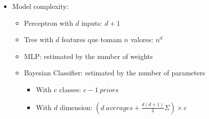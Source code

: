 \documentclass[twocolumn, 10pt]{article}
\begin{document}
\begin{itemize}[leftmargin=*, itemsep=0pt]
\begin{itemize}[topsep=0pt]
    \end{itemize}

    \item Model complexity:
    \begin{itemize}[topsep=0pt]
        \item Perceptron with $d$ inputs: $d+1$
        \item Tree with $d$ features que tomam $n$ valores: $\displaystyle n^d$
        \item MLP: estimated by the number of weights
        \item Bayesian Classifier: estimated by the number of parameters
        \begin{itemize}[topsep=0pt, itemsep=0pt]
            \item With $c$ classes: $c-1\ priors$
            \item With $d$ dimension: $\displaystyle (d\ averages+\frac{d(d+1)}{2}\Sigma)\times c$
        \end{itemize}
    \end{itemize}

\end{itemize}
\end{document}
